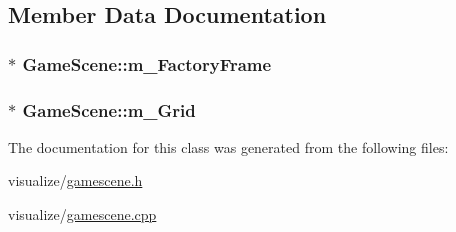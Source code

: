 \subsection{Member Data Documentation}
\hypertarget{class_game_scene_a351336f2ee9eab34e1fd2d95ea0fddf7}{
\subsubsection[{m\_\-FactoryFrame}]{$\ast$ {\bf GameScene::m\_\-FactoryFrame}}}
\label{class_game_scene_a351336f2ee9eab34e1fd2d95ea0fddf7}
\hypertarget{class_game_scene_a407e753bbdbbca9b4b682bb629728385}{
\subsubsection[{m\_\-Grid}]{$\ast$ {\bf GameScene::m\_\-Grid}}}
\label{class_game_scene_a407e753bbdbbca9b4b682bb629728385}


The documentation for this class was generated from the following files:\begin{DoxyCompactItemize}
\item 
visualize/\hyperlink{gamescene_8h}{gamescene.h}\item 
visualize/\hyperlink{gamescene_8cpp}{gamescene.cpp}\end{DoxyCompactItemize}

